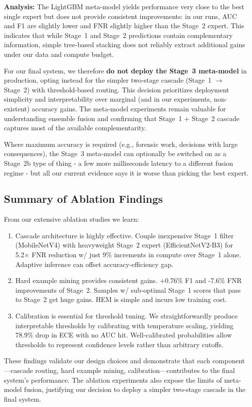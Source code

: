 \textbf{Analysis:}
The LightGBM meta\hyp model yields performance very close to the best single expert but does not provide consistent improvements: in our runs, AUC and F1 are slightly lower and FNR slightly higher than the Stage~2 expert. This indicates that while Stage~1 and Stage~2 predictions contain complementary information, simple tree\hyp based stacking does not reliably extract additional gains under our data and compute budget.

For our final system, we therefore \textbf{do not deploy the Stage~3 meta\hyp model} in production, opting instead for the simpler two\hyp stage cascade (Stage~1 $\to$ Stage~2) with threshold\hyp based routing. This decision prioritizes deployment simplicity and interpretability over marginal (and in our experiments, non\hyp existent) accuracy gains. The meta\hyp model experiments remain valuable for understanding ensemble fusion and confirming that Stage~1 + Stage~2 cascade captures most of the available complementarity.

Where maximum accuracy is required (e.g., forensic work, decisions with large consequences), the Stage~3 meta\hyp model can optionally be switched on as a Stage~2b type of thing \hyp{} a few more milliseconds latency to a different fusion regime \hyp{} but all our current evidence says it is worse than picking the best expert.

\subsection{Summary of Ablation Findings}

From our extensive ablation studies we learn:

\begin{enumerate}[leftmargin=*,itemsep=2pt,parsep=0pt]
  \item Cascade architecture is highly effective. Couple inexpensive Stage~1 filter (MobileNetV4) with heavyweight Stage~2 expert (EfficientNetV2\hyp B3) for 5.2× FNR reduction w/ just 9\% increments in compute over Stage~1 alone. Adaptive inference can offset accuracy\hyp efficiency gap.

  \item Hard example mining provides consistent gains. +0.76\% F1 and -7.6\% FNR improvements of Stage~2. Samples w/ sub\hyp optimal Stage~1 scores that pass to Stage~2 get huge gains. HEM is simple and incurs low training cost.

  \item Calibration is essential for threshold tuning. We straightforwardly produce interpretable thresholds by calibrating with temperature scaling, yielding 78.9\% drop in ECE with no AUC hit. Well\hyp calibrated probabilities allow thresholds to represent confidence levels rather than arbitrary cutoffs.
\end{enumerate}

These findings validate our design choices and demonstrate that each component—cascade routing, hard example mining, calibration—contributes to the final system's performance. The ablation experiments also expose the limits of meta\hyp model fusion, justifying our decision to deploy a simpler two\hyp stage cascade in the final system.
